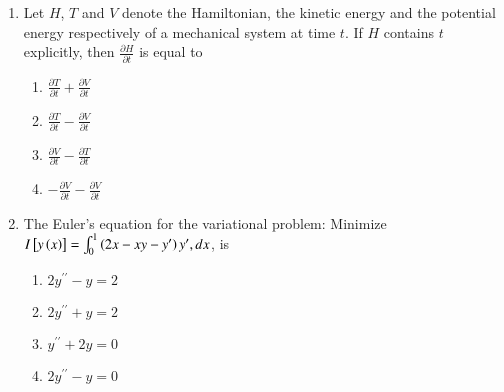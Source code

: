 \documentclass[journal]{IEEEtran}
\begin{document}
\begin{enumerate}
\item Let $H$, $T$ and $V$ denote the Hamiltonian, the kinetic energy and the potential energy respectively of a mechanical system at time $t$. If $H$ contains $t$ explicitly, then $\frac{\partial H}{\partial t}$ is equal to
\begin{multicols}{2}
    \begin{enumerate}
        \item $\frac{\partial T}{\partial t} + \frac{\partial V}{\partial t}$
        \item $\frac{\partial T}{\partial t} - \frac{\partial V}{\partial t}$
        \item $\frac{\partial V}{\partial t} - \frac{\partial T}{\partial t}$
        \item $-\frac{\partial V}{\partial t} - \frac{\partial V}{\partial t}$
    \end{enumerate}
\end{multicols}

\item The Euler's equation for the variational problem: Minimize \\$I{}\left[y\left(x\right)\right] = \int_0^1 \left(2x - xy - y^{\prime}\right) y^{\prime}, dx$, is 
\begin{multicols}{2}
    \begin{enumerate}
        \item $2y^{{\prime}{\prime}} - y = 2$
        \item $2y^{{\prime}{\prime}} + y = 2$
        \item $y^{{\prime}{\prime}} + 2y = 0$
        \item $2y^{{\prime}{\prime}} - y = 0$
    \end{enumerate}
\end{multicols}
\end{enumerate}
\end{document}
